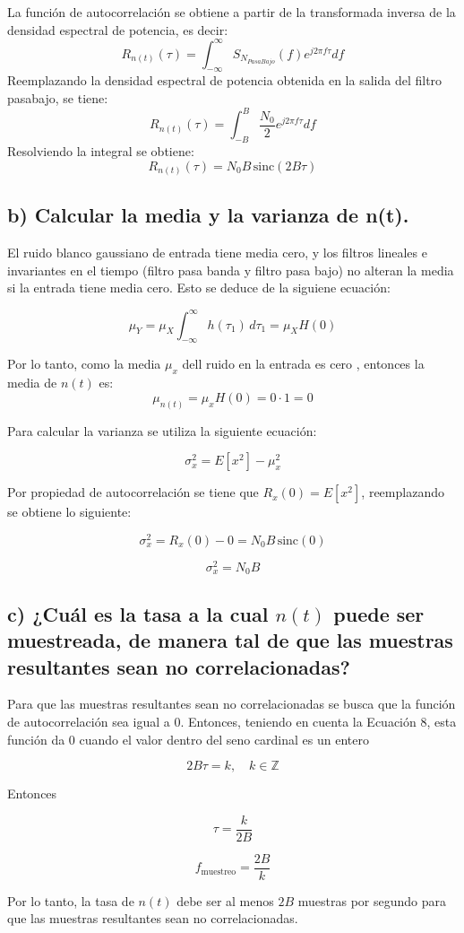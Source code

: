 	La función de autocorrelación se obtiene a partir de la transformada inversa de la densidad espectral de potencia, es 
	decir:
		\[
			R_{n(t)}(\tau) = \int_{-\infty}^{\infty} S_{N_{PasaBajo}}(f) e^{j 2 \pi f \tau} df
		\]
	Reemplazando la densidad espectral de potencia obtenida en la salida del filtro pasabajo, se tiene:
		\[
			R_{n(t)}(\tau) = \int_{-B}^{B} \dfrac{N_0}{2} e^{j 2 \pi f \tau} df
		\]
	Resolviendo la integral se obtiene:
		\[
			R_{n(t)}(\tau) = N_0 B \, \text{sinc}(2 B \tau)
		\]
	

\subsection*{b) Calcular la media y la varianza de n(t).} \par

	El ruido blanco gaussiano de entrada tiene media cero, y los filtros lineales e invariantes en el tiempo (filtro pasa banda 
	y filtro pasa bajo) no alteran la media si la entrada tiene media cero. Esto se deduce de la siguiene ecuación:
	
		\[
			\mu_Y = \mu_X \int_{-\infty}^{\infty} h(\tau_1)\, d\tau_1 = \mu_X H(0)
		\]

	Por lo tanto, como la media $\mu_x$ dell ruido en la entrada es cero , entonces la media de $n(t)$ es:
		\[
			\mu_{n(t)} = \mu_x H(0) = 0 \cdot 1 = 0
		\]
	
	Para calcular la varianza se utiliza la siguiente ecuación:

		\[
		\sigma_x^2 = E[x^2] - \mu_x^2
		\]

	Por propiedad de autocorrelación se tiene que \(R_x(0) = E[x^2]\), reemplazando se obtiene lo siguiente:

		\[
		\sigma_x^2 = R_x(0) - 0 = N_0 B \, \text{sinc}(0)
		\]

		\[
		\sigma_x^2 = N_0 B
		\]


\subsection*{c) ¿Cuál es la tasa a la cual $n(t)$ puede ser muestreada, de manera tal de que las muestras resultantes sean no
 correlacionadas?} \par

	Para que las muestras resultantes sean no correlacionadas se busca que la función de autocorrelación sea igual a 0. Entonces,
	teniendo en cuenta la Ecuación 8, esta función da 0 cuando el valor dentro del seno cardinal es un entero
		

		\[
			2B\tau = k, \quad k \in \mathbb{Z}
		\]

	Entonces

		\[
			\tau = \frac{k}{2B}
		\]

		\[
			f_{\text{muestreo}} = \frac{2B}{k}
		\]

	Por lo tanto, la tasa de \(n(t)\) debe ser al menos \(2B\) muestras por segundo para que las muestras 
	resultantes sean no correlacionadas.
